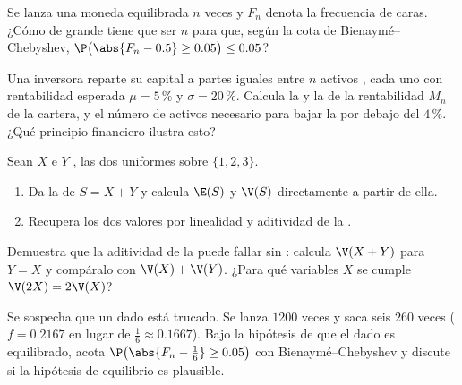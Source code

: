 \begin{exercise}[$\star$]\label{exo:g12:sums:3}
Se lanza una moneda equilibrada $n$ veces y $F_n$ denota la frecuencia de
caras. ¿Cómo de grande tiene que ser $n$ para que, según la cota de
Bienaymé--Chebyshev,
$\P\bigl(\abs{F_n - 0.5} \geq 0.05\bigr) \leq 0.05$?
\end{exercise}

\begin{exercise}[$\star\star$]\label{exo:g12:sums:4}
Una inversora reparte su capital a partes iguales entre $n$ activos
, cada uno con rentabilidad esperada $\mu = 5\,\%$ y
 $\sigma = 20\,\%$. Calcula la  y la  de la rentabilidad $M_n$ de la cartera, y el número de activos
necesario para bajar la  por debajo del $4\,\%$. ¿Qué
principio financiero ilustra esto?
\end{exercise}

\begin{exercise}[$\star\star$]\label{exo:g12:sums:5}
Sean $X$ e $Y$ , las dos uniformes sobre $\{1, 2, 3\}$.
\begin{enumerate}
  \item Da la  de $S = X + Y$ y calcula $\E(S)$ y $\V(S)$
        directamente a partir de ella.
  \item Recupera los dos valores por linealidad y aditividad de la
        .
\end{enumerate}
\end{exercise}

\begin{exercise}[$\star\star$]\label{exo:g12:sums:6}
Demuestra que la aditividad de la  puede fallar sin :
calcula $\V(X + Y)$ para $Y = X$ y compáralo con $\V(X) + \V(Y)$. ¿Para qué
variables $X$ se cumple $\V(2X) = 2\V(X)$?
\end{exercise}

\begin{exercise}[$\star\star$]\label{exo:g12:sums:7}
Se sospecha que un dado está trucado. Se lanza $1200$ veces y saca seis
$260$ veces ($f = 0.2167$ en lugar de $\frac16 \approx 0.1667$). Bajo la
hipótesis de que el dado es equilibrado, acota
$\P\bigl(\abs{F_n - \frac16} \geq 0.05\bigr)$ con Bienaymé--Chebyshev y
discute si la hipótesis de equilibrio es plausible.
\end{exercise}

